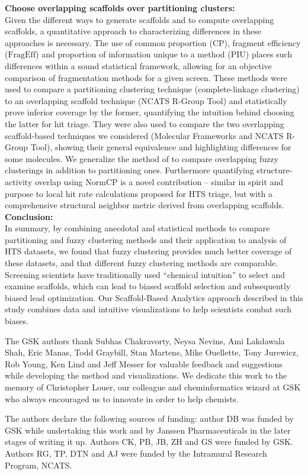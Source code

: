 \documentclass[journal=jacsat,biochem,manuscript=article]{achemso}
\begin{document}
{\bf Choose overlapping scaffolds over partitioning clusters:}\\
Given the different ways to generate scaffolds and to compute
overlapping scaffolds, a quantitative approach to characterizing
differences in these approaches is necessary. The use of common
proportion ($\textrm{CP}$), fragment efficiency ($\textrm{FragEff}$)
and proportion of information unique to a method ($\textrm{PIU}$) 
places such differences within a sound statistical framework, allowing
for an objective comparison of fragmentation methods for a given
screen. These methods were used to compare a partitioning clustering technique (complete-linkage clustering) to an overlapping scaffold technique (NCATS R-Group Tool) and statistically prove inferior coverage by the former, quantifying the intuition behind choosing the latter for hit triage. They were also used to compare the two overlapping scaffold-based techniques we considered (Molecular Frameworks and NCATS R-Group Tool), showing their general equivalence and highlighting differences for some molecules.  We generalize the method of \citet{Torres2009} to compare overlapping fuzzy clusterings in addition to partitioning ones.  Furthermore quantifying
structure-activity overlap using $\textrm{NormCP}$ is a novel
contribution -- similar in spirit and purpose to local hit rate
calculations proposed for HTS triage\cite{Posner2009},
but with a comprehensive structural neighbor metric derived from overlapping
scaffolds.\\



{\bf Conclusion:}\\
In summary, by combining anecdotal and statistical methods to compare
partitioning and fuzzy clustering methods and their application to
analysis of HTS datasets, we found that fuzzy clustering provides much
better coverage of these datasets, and that different fuzzy clustering
methods are comparable. Screening scientists have traditionally used
``chemical intuition'' to select and examine scaffolds, which can lead
to biased scaffold selection and subsequently biased lead
optimization. Our Scaffold-Based Analytics approach described in this
study combines data and intuitive visualizations to help scientists
combat such biases.


\begin{acknowledgement}
  The GSK authors thank Subhas Chakravorty, Neysa Nevins, Ami
  Lakdawala Shah, Eric Manas, Todd Graybill, Stan Martens, Mike
  Ouellette, Tony Jurewicz, Rob Young, Ken Lind and Jeff Messer for
  valuable feedback and suggestions while developing the method and
  visualizations. We dedicate this work to the memory of Christopher
  Louer, our colleague and cheminformatics wizard at GSK who always
  encouraged us to innovate in order to help chemists.

  The authors declare the following sources of funding: author DB was
  funded by GSK while undertaking this work and by Janssen
  Pharmaceuticals in the later stages of writing it up. Authors CK,
  PB, JB, ZH and GS were funded by GSK. Authors RG, TP, DTN and AJ
  were funded by the Intramural Research Program, NCATS.
     
\end{acknowledgement}
\end{document}
